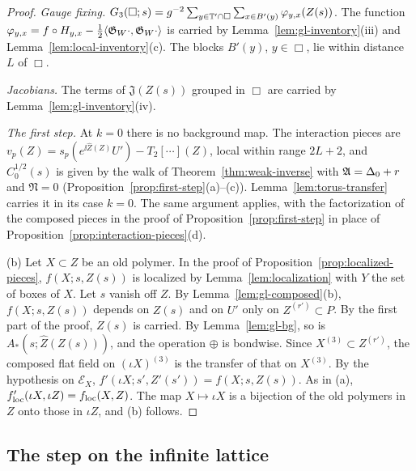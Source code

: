 \begin{proof}
\emph{Gauge fixing.} $G_3(\Box;s)=g^{-2}\sum_{y\in\mathbb T'\cap\Box}\sum_{x\in B'(y)}\varphi_{y,x}(Z(s))$. The function $\varphi_{y,x}=f\circ H_{y,x}-\frac12\langle \mathfrak G_W\cdot,\mathfrak G_W\cdot\rangle$ is carried by Lemma~\ref{lem:gl-inventory}(iii) and Lemma~\ref{lem:local-inventory}(c). The blocks $B'(y)$, $y\in\Box$, lie within distance $L$ of $\Box$.

\emph{Jacobians.} The terms of $\mathfrak J(Z(s))$ grouped in $\Box$ are carried by Lemma~\ref{lem:gl-inventory}(iv).

\emph{The first step.} At $k=0$ there is no background map. The interaction pieces are $v_p(Z)=s_p(e^{\ii\hat Z(Z)}U')-T_2[\cdots](Z)$, local within range $2L+2$, and $C_0^{1/2}(s)$ is given by the walk of Theorem~\ref{thm:weak-inverse} with $\mathfrak A=\Delta_0+r$ and $\mathfrak N=0$ (Proposition~\ref{prop:first-step}(a)--(c)). Lemma~\ref{lem:torus-transfer} carries it in its case $k=0$. The same argument applies, with the factorization of the composed pieces in the proof of Proposition~\ref{prop:first-step} in place of Proposition~\ref{prop:interaction-pieces}(d).

(b) Let $X\subset Z$ be an old polymer. In the proof of Proposition~\ref{prop:localized-pieces}, $f(X;s,Z(s))$ is localized by Lemma~\ref{lem:localization} with $Y$ the set of boxes of $X$. Let $s$ vanish off $Z$. By Lemma~\ref{lem:gl-composed}(b), $f(X;s,Z(s))$ depends on $Z(s)$ and on $U'$ only on $Z^{(r')}\subset P$. By the first part of the proof, $Z(s)$ is carried. By Lemma~\ref{lem:gl-bg}, so is $A_*(s;\hat Z(Z(s)))$, and the operation $\oplus$ is bondwise. Since $X^{(3)}\subset Z^{(r')}$, the composed flat field on $(\iota X)^{(3)}$ is the transfer of that on $X^{(3)}$. By the hypothesis on $\mathcal E_X$, $f'(\iota X;s',Z'(s'))=f(X;s,Z(s))$. As in (a), $f'_{\rm loc}(\iota X,\iota Z)=f_{\rm loc}(X,Z)$. The map $X\mapsto\iota X$ is a bijection of the old polymers in $Z$ onto those in $\iota Z$, and (b) follows.
\end{proof}

\subsection{The step on the infinite lattice}\label{subsec:gl-functional}

